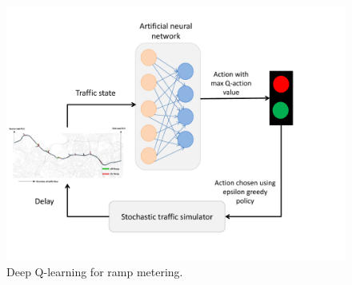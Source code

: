 \documentclass{sig-alternate-05-2015}
\begin{document}
\begin{figure}[!htbp]
    \centering
    \includegraphics[scale=0.385]{images/DQN-RM.pdf}

    \caption{Deep Q-learning for ramp metering.}
    \label{fig:dqn-rm}
\end{figure}
\end{document}
